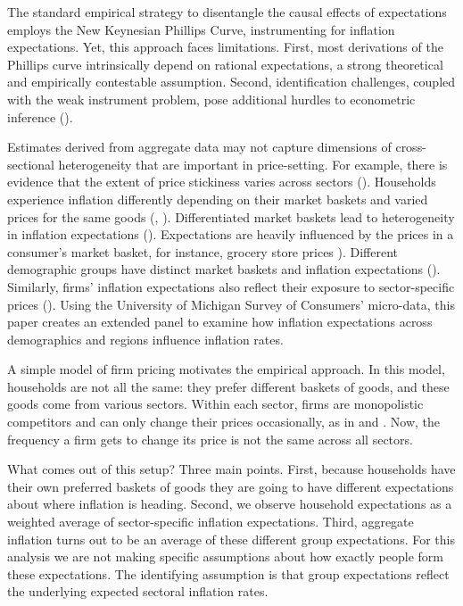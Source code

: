 \documentclass[12pt]{article}
\begin{document}
The standard empirical strategy to disentangle the causal effects of expectations employs the New Keynesian Phillips Curve, instrumenting for inflation expectations.  Yet, this approach faces limitations.  First, most derivations of the Phillips curve intrinsically depend on rational expectations, a strong theoretical and empirically contestable assumption.  Second, identification challenges, coupled with the weak instrument problem, pose additional hurdles to econometric inference (\cite{Stocketal:JEL2014}). 

Estimates derived from aggregate data may not capture dimensions of cross-sectional heterogeneity that are important in price-setting.  For example, there is evidence that the extent of price stickiness varies across sectors (\cite{Cravinoetal:JME2020, Boivinetal:AER2009, Almas:AER2012}).  Households experience inflation differently depending on their market baskets and varied prices for the same goods (\cite{KaplanWohl:JME2017}, \cite{HobijnLagakos:2005}).  Differentiated market baskets lead to heterogeneity in inflation expectations (\cite{AngelicoGiacomo:WP}).  Expectations are heavily influenced by the prices in a consumer's market basket, for instance, grocery store prices \cite{Dacunto:groceryJPE, AngelicoGiacomo:WP}).  Different demographic groups have distinct market baskets and inflation expectations (\cite{BryanVenkatu, Dacunto:PNAS, deBruinetal:2010, DasKahnenNagel:2020}). Similarly, firms' inflation expectations also reflect their exposure to sector-specific prices (\cite{Andradeetal:JME2021}).  Using the University of Michigan Survey of Consumers' micro-data, this paper creates an extended panel to examine how inflation expectations across demographics and regions influence inflation rates.

A simple model of firm pricing motivates the empirical approach.  In this model, households are not all the same: they prefer different baskets of goods, and these goods come from various sectors.  Within each sector, firms are monopolistic competitors and can only change their prices occasionally, as in \cite{Calvo:JMoE1983} and \cite{WoodfordBook}.  Now, the frequency a firm gets to change its price is not the same across all sectors.

What comes out of this setup?  Three main points.  First, because households have their own preferred baskets of goods they are going to have different expectations about where inflation is heading.  Second, we observe household expectations as a weighted average of sector-specific inflation expectations.  Third, aggregate inflation turns out to be an average of these different group expectations.  For this analysis we are not making specific assumptions about how exactly people form these expectations.  The identifying assumption is that group expectations reflect the underlying expected sectoral inflation rates.
\end{document}
